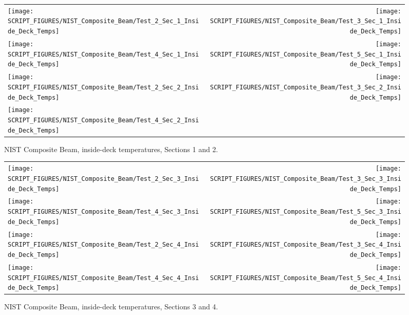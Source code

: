 \begin{figure}[p]
\begin{tabular*}{\textwidth}{l@{\extracolsep{\fill}}r}
\texttt{[image: SCRIPT\_FIGURES/NIST\_Composite\_Beam/Test\_2\_Sec\_1\_Inside\_Deck\_Temps]} &
\texttt{[image: SCRIPT\_FIGURES/NIST\_Composite\_Beam/Test\_3\_Sec\_1\_Inside\_Deck\_Temps]} \\
\texttt{[image: SCRIPT\_FIGURES/NIST\_Composite\_Beam/Test\_4\_Sec\_1\_Inside\_Deck\_Temps]} &
\texttt{[image: SCRIPT\_FIGURES/NIST\_Composite\_Beam/Test\_5\_Sec\_1\_Inside\_Deck\_Temps]} \\
\texttt{[image: SCRIPT\_FIGURES/NIST\_Composite\_Beam/Test\_2\_Sec\_2\_Inside\_Deck\_Temps]} &
\texttt{[image: SCRIPT\_FIGURES/NIST\_Composite\_Beam/Test\_3\_Sec\_2\_Inside\_Deck\_Temps]} \\
\texttt{[image: SCRIPT\_FIGURES/NIST\_Composite\_Beam/Test\_4\_Sec\_2\_Inside\_Deck\_Temps]} &
\end{tabular*}
\caption[NIST Composite Beam, inside-deck temperatures, Sections 1 and 2]{NIST Composite Beam, inside-deck temperatures, Sections 1 and 2.}
\label{NIST_CB_IDT_1-2}
\end{figure}

\begin{figure}[p]
\begin{tabular*}{\textwidth}{l@{\extracolsep{\fill}}r}
\texttt{[image: SCRIPT\_FIGURES/NIST\_Composite\_Beam/Test\_2\_Sec\_3\_Inside\_Deck\_Temps]} &
\texttt{[image: SCRIPT\_FIGURES/NIST\_Composite\_Beam/Test\_3\_Sec\_3\_Inside\_Deck\_Temps]} \\
\texttt{[image: SCRIPT\_FIGURES/NIST\_Composite\_Beam/Test\_4\_Sec\_3\_Inside\_Deck\_Temps]} &
\texttt{[image: SCRIPT\_FIGURES/NIST\_Composite\_Beam/Test\_5\_Sec\_3\_Inside\_Deck\_Temps]} \\
\texttt{[image: SCRIPT\_FIGURES/NIST\_Composite\_Beam/Test\_2\_Sec\_4\_Inside\_Deck\_Temps]} &
\texttt{[image: SCRIPT\_FIGURES/NIST\_Composite\_Beam/Test\_3\_Sec\_4\_Inside\_Deck\_Temps]} \\
\texttt{[image: SCRIPT\_FIGURES/NIST\_Composite\_Beam/Test\_4\_Sec\_4\_Inside\_Deck\_Temps]} &
\texttt{[image: SCRIPT\_FIGURES/NIST\_Composite\_Beam/Test\_5\_Sec\_4\_Inside\_Deck\_Temps]}
\end{tabular*}
\caption[NIST Composite Beam, inside-deck temperatures, Sections 3 and 4]{NIST Composite Beam, inside-deck temperatures, Sections 3 and 4.}
\label{NIST_CB_IDT_3-4}
\end{figure}

